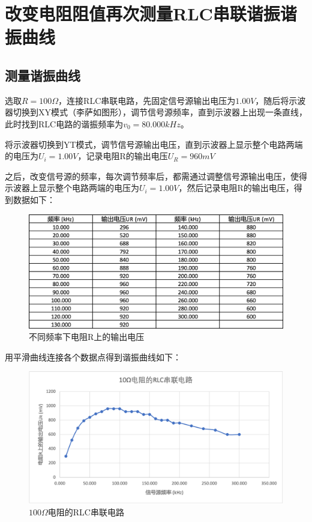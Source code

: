 \documentclass{article}
\begin{document}
\section{改变电阻阻值再次测量RLC串联谐振谐振曲线}
\subsection{测量谐振曲线}
选取$R = 100 \Omega$，连接RLC串联电路，先固定信号源输出电压为$1.00V$，随后将示波器切换到XY模式（李萨如图形），调节信号源频率，直到示波器上出现一条直线，此时找到RLC电路的谐振频率为$v_0 = 80.000 kHz$。

将示波器切换到YT模式，调节信号源输出电压，直到示波器上显示整个电路两端的电压为$U_i = 1.00V$，记录电阻R的输出电压$U_R = 960 mV$

之后，改变信号源的频率，每次调节频率后，都需通过调整信号源输出电压，使得示波器上显示整个电路两端的电压为$U_i= 1.00V$，然后记录电阻R的输出电压，得到数据如下：
\begin{figure}[htbp]
    \centering
    \includegraphics[width=1.0\textwidth]{2-1.png}
    \caption{不同频率下电阻R上的输出电压}
\end{figure}

用平滑曲线连接各个数据点得到谐振曲线如下：
\begin{figure}[htbp]
    \centering
    \includegraphics[width=1.0\textwidth]{2-2.png}
    \caption{$100\Omega$电阻的RLC串联电路}
\end{figure}
\end{document}

